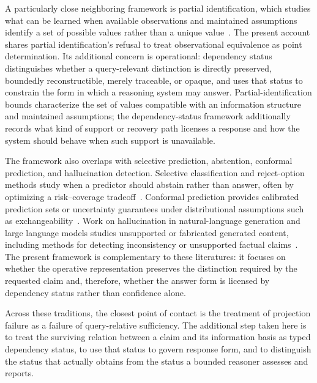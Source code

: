 \documentclass[11pt]{article}
\begin{document}
A particularly close neighboring framework is partial identification, which studies what can be learned when available observations and maintained assumptions identify a set of possible values rather than a unique value~\cite{Manski2003,Manski2007}. The present account shares partial identification's refusal to treat observational equivalence as point determination. Its additional concern is operational: dependency status distinguishes whether a query-relevant distinction is directly preserved, boundedly reconstructible, merely traceable, or opaque, and uses that status to constrain the form in which a reasoning system may answer. Partial-identification bounds characterize the set of values compatible with an information structure and maintained assumptions; the dependency-status framework additionally records what kind of support or recovery path licenses a response and how the system should behave when such support is unavailable.

The framework also overlaps with selective prediction, abstention, conformal prediction, and hallucination detection. Selective classification and reject-option methods study when a predictor should abstain rather than answer, often by optimizing a risk--coverage tradeoff~\cite{Geifman2017,Geifman2019}. Conformal prediction provides calibrated prediction sets or uncertainty guarantees under distributional assumptions such as exchangeability~\cite{Vovk2005,Shafer2008}. Work on hallucination in natural-language generation and large language models studies unsupported or fabricated generated content, including methods for detecting inconsistency or unsupported factual claims~\cite{Ji2023,Manakul2023}. The present framework is complementary to these literatures: it focuses on whether the operative representation preserves the distinction required by the requested claim and, therefore, whether the answer form is licensed by dependency status rather than confidence alone.

Across these traditions, the closest point of contact is the treatment of projection failure as a failure of query-relative sufficiency. The additional step taken here is to treat the surviving relation between a claim and its information basis as typed dependency status, to use that status to govern response form, and to distinguish the status that actually obtains from the status a bounded reasoner assesses and reports.
\end{document}
